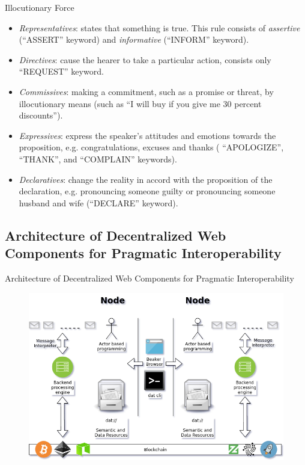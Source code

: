\documentclass[10pt]{beamer}
\begin{document}
    \begin{frame}[fragile]{Illocutionary Force}

\begin{itemize}
  \item \textit{Representatives}: states that something is true. This rule consists of \textit{assertive} (``ASSERT'' keyword) and \textit{informative} (``INFORM'' keyword).
  \item \textit{Directives}: cause the hearer to take a particular action, consists only ``REQUEST'' keyword.
  \item \textit{Commissives}: making a commitment, such as a promise or threat, by illocutionary means (such as ``I will buy if you give me 30 percent discounts'').
  \item  \textit{Expressives}: express the speaker's attitudes and emotions towards the proposition, e.g. congratulations, excuses and thanks ( ``APOLOGIZE'', ``THANK'', and ``COMPLAIN'' keywords).
  \item \textit{Declaratives}: change the reality in accord with the proposition of the declaration, e.g. pronouncing someone guilty or pronouncing someone husband and wife (``DECLARE'' keyword).
\end{itemize}

    \end{frame}

  \subsection{Architecture of Decentralized Web Components for Pragmatic Interoperability}

    \begin{frame}[fragile]{Architecture of Decentralized Web Components for Pragmatic Interoperability}

      \begin{figure}[h]
      \includegraphics[scale=0.4]{decweb-pragmatic-int}
      \end{figure}

    \end{frame}
\end{document}
